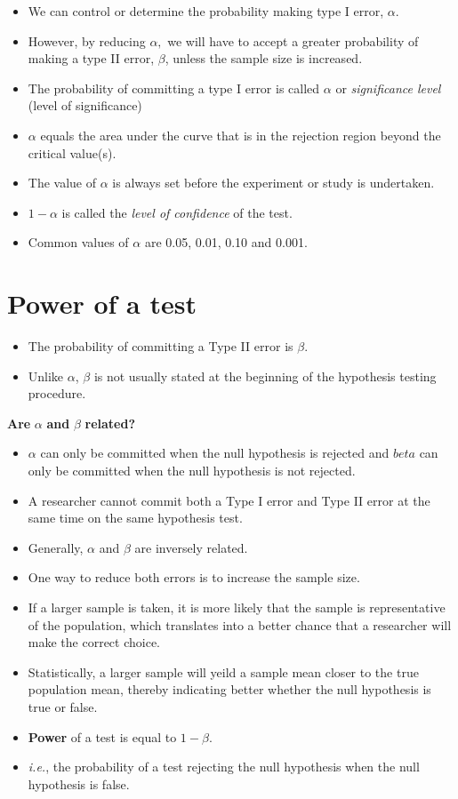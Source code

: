 \documentclass[]{book}
\providecommand{\tightlist}{%
  \setlength{\itemsep}{0pt}\setlength{\parskip}{0pt}}
\begin{document}
\begin{itemize}
\tightlist
\item
  We can control or determine the probability making type I error, \(\alpha\).
\item
  However, by reducing \(\alpha,\) we will have to accept a greater probability of making a type II error, \(\beta\), unless the sample size is increased.
\item
  The probability of committing a type I error is called \(\alpha\) or \emph{significance level} (level of significance)
\item
  \(\alpha\) equals the area under the curve that is in the rejection region beyond the critical value(s).
\item
  The value of \(\alpha\) is always set before the experiment or study is undertaken.
\item
  \(1-\alpha\) is called the \emph{level of confidence} of the test.
\item
  Common values of \(\alpha\) are 0.05, 0.01, 0.10 and 0.001.
\end{itemize}

\hypertarget{power-of-a-test}{%
\section{Power of a test}\label{power-of-a-test}}

\begin{itemize}
\tightlist
\item
  The probability of committing a Type II error is \(\beta\).
\item
  Unlike \(\alpha\), \(\beta\) is not usually stated at the beginning of the hypothesis testing procedure.
\end{itemize}

\textbf{Are} \(\alpha\) \textbf{and} \(\beta\) \textbf{related?}

\begin{itemize}
\item
  \(\alpha\) can only be committed when the null hypothesis is rejected and \(beta\) can only be committed when the null hypothesis is not rejected.
\item
  A researcher cannot commit both a Type I error and Type II error at the same time on the same hypothesis test.
\item
  Generally, \(\alpha\) and \(\beta\) are inversely related. 
\item
  One way to reduce both errors is to increase the sample size.
\item
  If a larger sample is taken, it is more likely that the sample is representative of the population, which translates into a better chance that a researcher will make the correct choice.
\item
  Statistically, a larger sample will yeild a sample mean closer to the true population mean, thereby indicating better whether the null hypothesis is true or false.
\item
  \textbf{Power} of a test is equal to \(1-\beta.\)
\item
  \emph{i.e.}, the probability of a test rejecting the null hypothesis when the null hypothesis is false.
\end{itemize}
\end{document}

